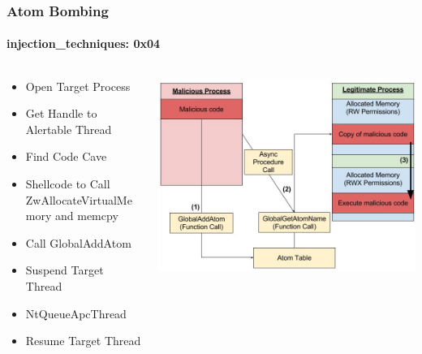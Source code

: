 \documentclass[aspectratio=169]{beamer}
\begin{document}
\begin{frame}
  \frametitle{Atom Bombing}
  \framesubtitle{injection\_techniques: 0x04}
  \begin{columns}
    \begin{column}{.4\textwidth}
      \begin{itemize}
        \item{Open Target Process}
        \item{Get Handle to Alertable Thread}
        \item{Find Code Cave}
        \item{Shellcode to Call ZwAllocateVirtualMemory and memcpy}
        \item{Call GlobalAddAtom}
        \item {Suspend Target Thread}
        \item{NtQueueApcThread}
        \item{Resume Target Thread}
      \end{itemize}
    \end{column}
    \hfill
    \begin{column}{.6\textwidth}
      \begin{center}
        \includegraphics[scale=0.30]{atom-bombing}
      \end{center}
    \end{column}
  \end{columns}
\end{frame}
\end{document}
